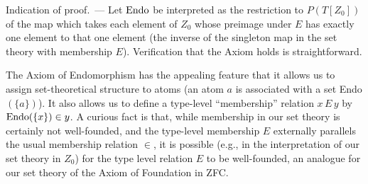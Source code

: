 {\sc Indication of proof.~---} Let $\mathop{\mathrm{Endo}}$ be interpreted as the
restriction to $P(T[Z_0])$ of the map which takes each element of
$Z_0$ whose preimage under $E$ has exactly one element to that one
element (the inverse of the singleton map in the set
theory with membership $E$).  Verification that the Axiom
holds is straightforward.
\finpreuve

The Axiom of Endomorphism has the appealing feature that it allows us
to assign set-theoretical structure to atoms (an atom $a$ is
associated with a set Endo$(\{a\})$).  It also allows us to define a
type-level ``membership'' relation $x \,E\,y$ by
$\mathop{\mathrm{Endo}}(\{x\}) \in y$.  A curious fact is that, while
membership
in our set theory is certainly not well-founded, and the type-level membership
$E$ externally parallels the usual membership relation $\in$, it is possible
(e.g., in the interpretation of our set theory in $Z_0$) for the type level
relation $E$ to be well-founded, an analogue for our set theory of the
Axiom of Foundation in
ZFC.




\Exercises

